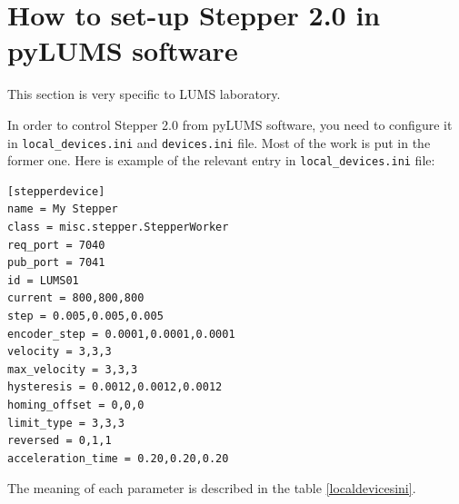 \documentclass[10pt,article]{article}
\begin{document}
\newpage
\section{How to set-up Stepper 2.0 in pyLUMS software}
This section is very specific to LUMS laboratory.

In order to control Stepper 2.0 from pyLUMS software, you need to configure it in \texttt{local\_devices.ini} and \texttt{devices.ini} file. Most of the work is put in the former one. Here is example of the relevant entry in \texttt{local\_devices.ini} file:

\begin{verbatim}
[stepperdevice]
name = My Stepper
class = misc.stepper.StepperWorker
req_port = 7040   
pub_port = 7041
id = LUMS01
current = 800,800,800
step = 0.005,0.005,0.005
encoder_step = 0.0001,0.0001,0.0001
velocity = 3,3,3
max_velocity = 3,3,3
hysteresis = 0.0012,0.0012,0.0012
homing_offset = 0,0,0
limit_type = 3,3,3
reversed = 0,1,1
acceleration_time = 0.20,0.20,0.20
\end{verbatim}

The meaning of each parameter is described in the table \ref{localdevicesini}.
\end{document}

